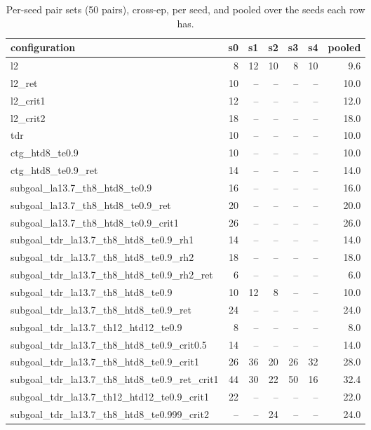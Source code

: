 \begin{table}[H]
\centering\small
\caption{Per-seed pair sets (50 pairs), cross-ep, per seed, and pooled over the seeds each row has.}
\label{tab:gas-mpc-pooled-cross-perseed-n50}
\begin{tabular}{lrrrrrr}
\toprule
configuration & s0 & s1 & s2 & s3 & s4 & pooled \\
\midrule
l2 & 8 & 12 & 10 & 8 & 10 & 9.6 \\
l2\_ret & 10 & -- & -- & -- & -- & 10.0 \\
l2\_crit1 & 12 & -- & -- & -- & -- & 12.0 \\
l2\_crit2 & 18 & -- & -- & -- & -- & 18.0 \\
tdr & 10 & -- & -- & -- & -- & 10.0 \\
ctg\_htd8\_te0.9 & 10 & -- & -- & -- & -- & 10.0 \\
ctg\_htd8\_te0.9\_ret & 14 & -- & -- & -- & -- & 14.0 \\
subgoal\_la13.7\_th8\_htd8\_te0.9 & 16 & -- & -- & -- & -- & 16.0 \\
subgoal\_la13.7\_th8\_htd8\_te0.9\_ret & 20 & -- & -- & -- & -- & 20.0 \\
subgoal\_la13.7\_th8\_htd8\_te0.9\_crit1 & 26 & -- & -- & -- & -- & 26.0 \\
subgoal\_tdr\_la13.7\_th8\_htd8\_te0.9\_rh1 & 14 & -- & -- & -- & -- & 14.0 \\
subgoal\_tdr\_la13.7\_th8\_htd8\_te0.9\_rh2 & 18 & -- & -- & -- & -- & 18.0 \\
subgoal\_tdr\_la13.7\_th8\_htd8\_te0.9\_rh2\_ret & 6 & -- & -- & -- & -- & 6.0 \\
subgoal\_tdr\_la13.7\_th8\_htd8\_te0.9 & 10 & 12 & 8 & -- & -- & 10.0 \\
subgoal\_tdr\_la13.7\_th8\_htd8\_te0.9\_ret & 24 & -- & -- & -- & -- & 24.0 \\
subgoal\_tdr\_la13.7\_th12\_htd12\_te0.9 & 8 & -- & -- & -- & -- & 8.0 \\
subgoal\_tdr\_la13.7\_th8\_htd8\_te0.9\_crit0.5 & 14 & -- & -- & -- & -- & 14.0 \\
subgoal\_tdr\_la13.7\_th8\_htd8\_te0.9\_crit1 & 26 & 36 & 20 & 26 & 32 & 28.0 \\
subgoal\_tdr\_la13.7\_th8\_htd8\_te0.9\_ret\_crit1 & 44 & 30 & 22 & 50 & 16 & 32.4 \\
subgoal\_tdr\_la13.7\_th12\_htd12\_te0.9\_crit1 & 22 & -- & -- & -- & -- & 22.0 \\
subgoal\_tdr\_la13.7\_th8\_htd8\_te0.999\_crit2 & -- & -- & 24 & -- & -- & 24.0 \\

\end{tabular}
\end{table}
